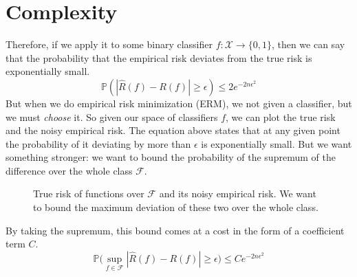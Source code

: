 \section{Complexity}

  Therefore, if we apply it to some binary classifier $f: \mathcal{X} \rightarrow \{0, 1\}$, then we can say that the probability that the empirical risk deviates from the true risk is exponentially small. 
  \begin{equation}
    \mathbb{P} (|\hat{R} (f) - R(f)| \geq \epsilon) \leq 2e^{- 2 n \epsilon^2}
  \end{equation}
  But when we do empirical risk minimization (ERM), we not given a classifier, but we must \textit{choose} it. So given our space of classifiers $f$, we can plot the true risk and the noisy empirical risk. The equation above states that at any given point the probability of it deviating by more than $\epsilon$ is exponentially small. But we want something stronger: we want to bound the probability of the supremum of the difference over the whole class $\mathcal{F}$. 

  \begin{figure}[H]
    \centering 
    \caption{True risk of functions over $\mathcal{F}$ and its noisy empirical risk. We want to bound the maximum deviation of these two over the whole class.} 
    \label{fig:true_vs_empirical_risk}
  \end{figure}

  By taking the supremum, this bound comes at a cost in the form of a coefficient term $C$. 
  \begin{equation}
    \mathbb{P} \big( \sup_{f \in \mathcal{F}} | \hat{R} (f) - R(f) | \geq \epsilon \big) \leq C e^{-2 n \epsilon^2}
  \end{equation}

